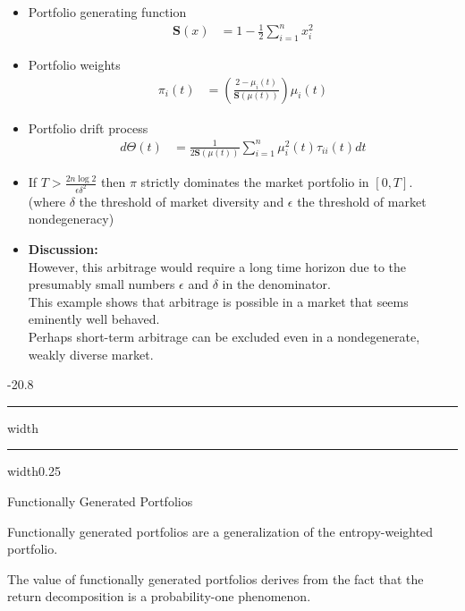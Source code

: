 \documentclass[a4paper,landscape,8pt,fleqn]{scrartcl}
\makeatletter
\renewcommand{\emph}[1]{\textbf{#1}}
\renewcommand{\section}{\@startsection{section}{1}{0mm}%
{-2\baselineskip}{0.8\baselineskip}%
{\hrule depth 0.2pt width\columnwidth\hrule depth1.5pt
width0.25\columnwidth\vspace*{1.2em}\Large\bfseries}}
\makeatother
\begin{document}
\begin{multicols*}{3}
\begin{itemize}
\item Portfolio generating function
\begin{align*}
\pmb{S}(x) &= 1 - \frac{1}{2} \sum_{i=1}^n x_i^2
\end{align*}
\item Portfolio weights
\begin{align*}
\pi_i(t) &= \left( \frac{2-\mu_i(t)}{\pmb{S}(\mu(t))} \right) \mu_i(t)
\end{align*}
\item Portfolio drift process
\begin{align*}
d\Theta(t) &= \frac{1}{2 \pmb{S}(\mu(t))} \sum_{i=1}^n \mu_i^2(t) \tau_{i i}(t) dt
\end{align*}
\item If $T > \frac{2 n \log 2}{\epsilon \delta^2}$ then $\pi$ strictly dominates the market portfolio in $[0,T]$. \\
(where $\delta$ the threshold of market diversity and $\epsilon$ the threshold of market nondegeneracy)
\item \emph{Discussion:} \\
However, this arbitrage would require a long time horizon due to the presumably small numbers $\epsilon$ and $\delta$ in the denominator. \\
This example shows that arbitrage is possible in a market that seems eminently well behaved. \\
Perhaps short-term arbitrage can be excluded even in a nondegenerate, weakly diverse market.
\end{itemize}


\columnbreak

\section{Functionally Generated Portfolios}

Functionally generated portfolios are a generalization of the entropy-weighted portfolio.

The value of functionally generated portfolios derives from the fact that the return decomposition is a probability-one phenomenon.


\end{multicols*}
\end{document}
